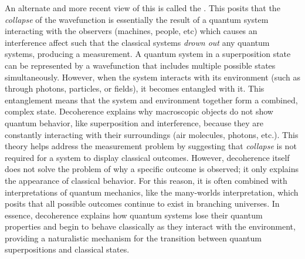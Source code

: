An alternate and more recent view of this is called the . This posits that the \textit{collapse} of the wavefunction is essentially the result of a quantum system interacting with the observers (machines, people, etc) which causes an interference affect such that the classical systems \textit{drown out} any quantum systems, producing a measurement. A quantum system in a superposition state can be represented by a wavefunction that includes multiple possible states simultaneously. However, when the system interacts with its environment (such as through photons, particles, or fields), it becomes entangled with it. This entanglement means that the system and environment together form a combined, complex state. Decoherence explains why macroscopic objects do not show quantum behavior, like superposition and interference, because they are constantly interacting with their surroundings (air molecules, photons, etc.). This theory helps address the measurement problem by suggesting that \textit{collapse} is not required for a system to display classical outcomes. However, decoherence itself does not solve the problem of why a specific outcome is observed; it only explains the appearance of classical behavior. For this reason, it is often combined with interpretations of quantum mechanics, like the many-worlds interpretation, which posits that all possible outcomes continue to exist in branching universes. In essence, decoherence explains how quantum systems lose their quantum properties and begin to behave classically as they interact with the environment, providing a naturalistic mechanism for the transition between quantum superpositions and classical states.


